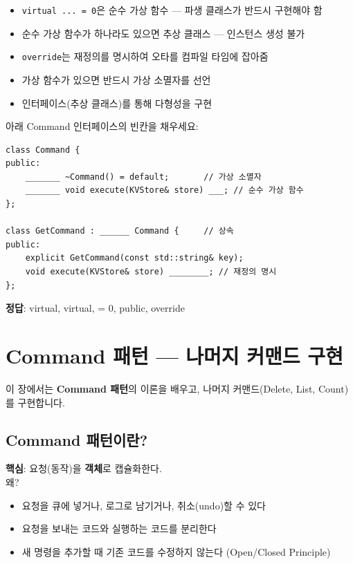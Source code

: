 \documentclass[11pt,a4paper]{book}
\newcommand{\code}[1]{\texttt{#1}}
\begin{document}
\begin{summarybox}
\begin{itemize}[nosep]
\item \code{virtual ... = 0}은 순수 가상 함수 — 파생 클래스가 반드시 구현해야 함
\item 순수 가상 함수가 하나라도 있으면 추상 클래스 — 인스턴스 생성 불가
\item \code{override}는 재정의를 명시하여 오타를 컴파일 타임에 잡아줌
\item 가상 함수가 있으면 반드시 가상 소멸자를 선언
\item 인터페이스(추상 클래스)를 통해 다형성을 구현
\end{itemize}
\end{summarybox}

\begin{quizbox}
아래 Command 인터페이스의 빈칸을 채우세요:

\begin{lstlisting}[style=cpp,numbers=none]
class Command {
public:
    _______ ~Command() = default;       // 가상 소멸자
    _______ void execute(KVStore& store) ___; // 순수 가상 함수
};

class GetCommand : ______ Command {     // 상속
public:
    explicit GetCommand(const std::string& key);
    void execute(KVStore& store) ________; // 재정의 명시
};
\end{lstlisting}

\textbf{정답}: virtual, virtual, = 0, public, override
\end{quizbox}

\chapter{Command 패턴 — 나머지 커맨드 구현}
\label{ch:command}

이 장에서는 \textbf{Command 패턴}의 이론을 배우고, 나머지 커맨드(Delete, List, Count)를 구현합니다.

\section{Command 패턴이란?}

\begin{conceptbox}[title={Command 패턴}]
\textbf{핵심}: 요청(동작)을 \textbf{객체}로 캡슐화한다.\\[6pt]
왜?
\begin{itemize}[nosep]
\item 요청을 큐에 넣거나, 로그로 남기거나, 취소(undo)할 수 있다
\item 요청을 보내는 코드와 실행하는 코드를 분리한다
\item 새 명령을 추가할 때 기존 코드를 수정하지 않는다 (Open/Closed Principle)
\end{itemize}
\end{conceptbox}
\end{document}
